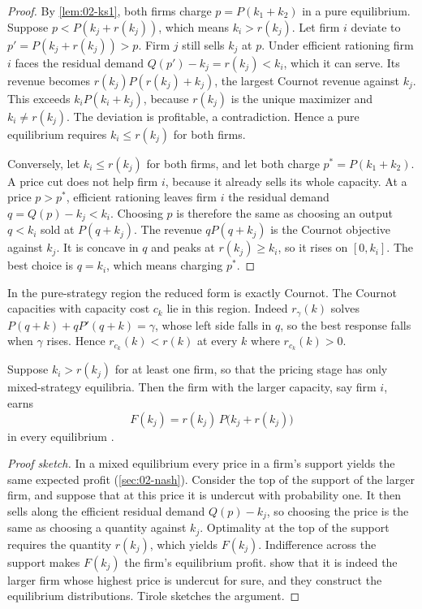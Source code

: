 \begin{proof}
By \cref{lem:02-ks1}, both firms charge $p = P(k_1 + k_2)$ in a pure equilibrium. Suppose $p < P(k_j + r(k_j))$,
which means $k_i > r(k_j)$. Let firm $i$ deviate to $p' = P(k_j + r(k_j)) > p$. Firm $j$ still sells $k_j$ at $p$.
Under efficient rationing firm $i$ faces the residual demand $Q(p') - k_j = r(k_j) < k_i$, which it can serve. Its
revenue becomes $r(k_j)P(r(k_j) + k_j)$, the largest Cournot revenue against $k_j$. This exceeds $k_iP(k_i + k_j)$,
because $r(k_j)$ is the unique maximizer and $k_i \ne r(k_j)$. The deviation is profitable, a contradiction. Hence a
pure equilibrium requires $k_i \le r(k_j)$ for both firms.

Conversely, let $k_i \le r(k_j)$ for both firms, and let both charge $p^* = P(k_1 + k_2)$. A price cut does not help
firm $i$, because it already sells its whole capacity. At a price $p > p^*$, efficient rationing leaves firm $i$ the
residual demand $q = Q(p) - k_j < k_i$. Choosing $p$ is therefore the same as choosing an output $q < k_i$ sold at
$P(q + k_j)$. The revenue $qP(q + k_j)$ is the Cournot objective against $k_j$. It is concave in $q$ and peaks at
$r(k_j) \ge k_i$, so it rises on $[0, k_i]$. The best choice is $q = k_i$, which means charging $p^*$.
\end{proof}

In the pure-strategy region the reduced form is exactly Cournot. The Cournot capacities with capacity cost $c_k$ lie
in this region. Indeed $r_\gamma(k)$ solves $P(q + k) + q P'(q + k) = \gamma$, whose left side falls in $q$, so the
best response falls when $\gamma$ rises. Hence $r_{c_k}(k) < r(k)$ at every $k$ where $r_{c_k}(k) > 0$.

\begin{lemma}\label{lem:02-ks3}
Suppose $k_i > r(k_j)$ for at least one firm, so that the pricing stage has only mixed-strategy equilibria. Then the
firm with the larger capacity, say firm $i$, earns
\begin{equation}\label{eq:02-ks-follower}
  F(k_j) = r(k_j)\,P\bigl(k_j + r(k_j)\bigr)
\end{equation}
in every equilibrium \citep[sec.~5.7.2.1, Lemma~3]{Tirole1988}.
\end{lemma}

\begin{proof}[Proof sketch]
In a mixed equilibrium every price in a firm's support yields the same expected profit (\cref{sec:02-nash}).
Consider the top of the support of the larger firm, and suppose that at this price it is undercut with probability
one. It then sells along the efficient residual demand $Q(p) - k_j$, so choosing the price is the same as choosing a
quantity against $k_j$. Optimality at the top of the support requires the quantity $r(k_j)$, which yields $F(k_j)$.
Indifference across the support makes $F(k_j)$ the firm's equilibrium profit. \citet{KrepsScheinkman1983} show that
it is indeed the larger firm whose highest price is undercut for sure, and they construct the equilibrium
distributions. Tirole sketches the argument.
\end{proof}

